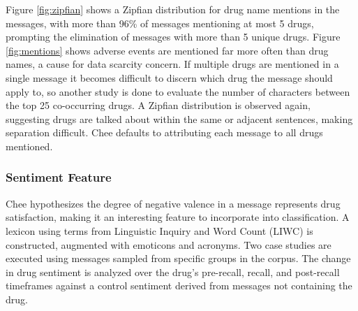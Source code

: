 \documentclass[twoside,11pt]{article}
\begin{document}
Figure \ref{fig:zipfian} shows a Zipfian distribution for drug name mentions in the messages, with more than 96\% of messages mentioning at most 5 drugs, prompting the elimination of messages with more than 5 unique drugs. Figure \ref{fig:mentions} shows adverse events are mentioned far more often than drug names, a cause for data scarcity concern. If multiple drugs are mentioned in a single message it becomes difficult to discern which drug the message should apply to, so another study is done to evaluate the number of characters between the top 25 co-occurring drugs. A Zipfian distribution is observed again, suggesting drugs are talked about within the same or adjacent sentences, making separation difficult. Chee defaults to attributing each message to all drugs mentioned.

\subsubsection{Sentiment Feature}
 Chee hypothesizes the degree of negative valence in a message represents drug satisfaction, making it an interesting feature to incorporate into classification. A lexicon using terms from Linguistic Inquiry and Word Count (LIWC) is constructed, augmented with emoticons and acronyms. Two case studies are executed using messages sampled from specific groups in the corpus. The change in drug sentiment is analyzed over the drug's pre-recall, recall, and post-recall timeframes against a control sentiment derived from messages not containing the drug.
\end{document}
